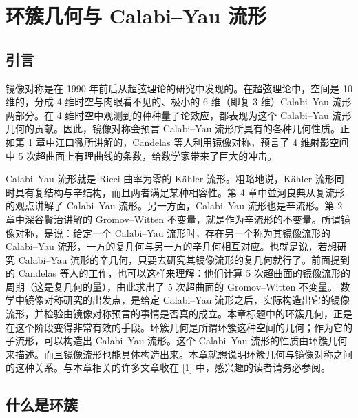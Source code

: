 \renewcommand{\thesection}{\arabic{section}}
\chapter{环簇几何与 Calabi--Yau 流形}

\section{引言}

镜像对称是在 1990 年前后从超弦理论的研究中发现的。在超弦理论中，空间是 10 维的，分成 4 维时空与肉眼看不见的、极小的 6 维（即复 3 维）Calabi--Yau 流形两部分。在 4 维时空中观测到的种种量子论效应，都表现为这个 Calabi--Yau 流形几何的贡献。因此，镜像对称会预言 Calabi--Yau 流形所具有的各种几何性质。正如第 1 章中江口徹所讲解的，Candelas 等人利用镜像对称，预言了 4 维射影空间中 5 次超曲面上有理曲线的条数，给数学家带来了巨大的冲击。

Calabi--Yau 流形就是 Ricci 曲率为零的 Kähler 流形。粗略地说，Kähler 流形同时具有复结构与辛结构，而且两者满足某种相容性。第 4 章中並河良典从复流形的观点讲解了 Calabi--Yau 流形。另一方面，Calabi--Yau 流形也是辛流形。第 2 章中深谷賢治讲解的 Gromov--Witten 不变量，就是作为辛流形的不变量。所谓镜像对称，是说：给定一个 Calabi--Yau 流形时，存在另一个称为其镜像流形的 Calabi--Yau 流形，一方的复几何与另一方的辛几何相互对应。也就是说，若想研究 Calabi--Yau 流形的辛几何，只要去研究其镜像流形的复几何就行了。前面提到的 Candelas 等人的工作，也可以这样来理解：他们计算 5 次超曲面的镜像流形的周期（这是复几何的量），由此求出了 5 次超曲面的 Gromov--Witten 不变量。
数学中镜像对称研究的出发点，是给定 Calabi--Yau 流形之后，实际构造出它的镜像流形，并检验由镜像对称预言的事情是否真的成立。本章标题中的环簇几何，正是在这个阶段变得非常有效的手段。环簇几何是所谓环簇这种空间的几何；作为它的子流形，可以构造出 Calabi--Yau 流形。这个 Calabi--Yau 流形的性质由环簇几何来描述。而且镜像流形也能具体构造出来。本章就想说明环簇几何与镜像对称之间的这种关系。与本章相关的许多文章收在 [1] 中，感兴趣的读者请务必参阅。

\section{什么是环簇}

